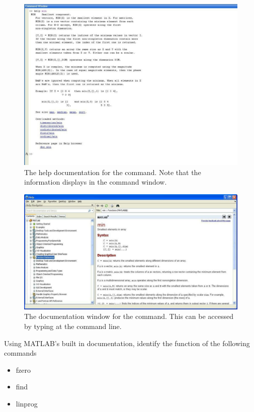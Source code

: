 \begin{center}
\begin{figure}
	\includegraphics[scale=0.3]{./Figures/help}
	\caption{The help documentation for the  command. Note that the information displays in the command window.}
\end{figure}
\begin{figure}
	\includegraphics[scale = .3]{./Figures/doc}
	\caption{The documentation window for the  command. This can be accessed by typing  at the command line.}
\end{figure}
\end{center}

\begin{problem}

Using MATLAB's built in documentation, identify the function of the following commands
\begin{itemize}
	\item fzero
	\item find
	\item linprog
\end{itemize}
\end{problem}

